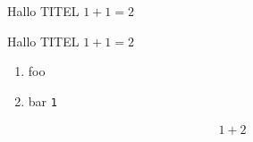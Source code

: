 \documentclass[parskip=full]{scrartcl}
\begin{document}
\begin{xframed}
Hallo TITEL $1+1=2$
\lipsum[1]
\end{xframed}
\lipsum[1]
\clearpage



\begin{xframed}
\centering
Hallo TITEL $1+1=2$
\xframedendhead
\begin{enumerate}
\item foo%
\item bar \verb+1+
\end{enumerate}
\lipsum[1]
\begin{align}
1+2
\end{align}
\end{xframed}
\end{document}
